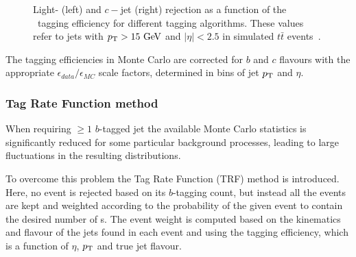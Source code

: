 \begin{figure}[tb]\begin{center}
	\caption{Light- (left) and $c-$jet (right) rejection as a function of the \bjet\ tagging efficiency
        for different tagging algorithms. These values refer to jets with $\pt >15\gev$ and 
$|\eta|<2.5$ in simulated $t\bar{t}$ events~\cite{btagging}.\label{fig:btageffs}}
\end{center}\end{figure}

The tagging efficiencies in Monte Carlo are corrected for $b$ and $c$ flavours
with the appropriate $\epsilon_{data}/\epsilon_{MC}$ scale factors,
determined in bins of jet $\pt$ and $\eta$.

\subsubsection{Tag Rate Function method}\label{sec:trf}

When requiring $\geq 1$ $b$-tagged jet the
available Monte Carlo statistics is significantly reduced for 
some particular background processes, leading to large
fluctuations in the resulting distributions.


To overcome this problem the Tag Rate Function (TRF) method is introduced.
Here, no event is rejected based on its $b$-tagging count, but instead all the events are 
kept and weighted according to the
probability of the given event to contain the desired number of \bjet s.
The event weight is computed based on the kinematics and flavour of the jets found in each event
and using the tagging efficiency, which is a function of $\eta$, $\pt$ and true jet flavour.

